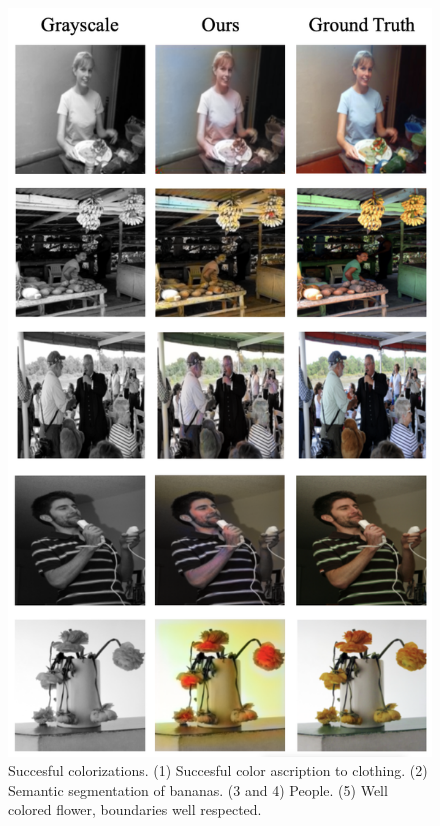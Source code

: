 \documentclass[10pt,twocolumn,letterpaper]{article}
\begin{document}
\begin{figure}
    \centering
    \includegraphics[width=1\linewidth]{latex/succesful colorizations.png}
    \caption{Succesful colorizations. (1) Succesful color ascription to clothing. (2) Semantic segmentation of bananas. (3 and 4) People. (5) Well colored flower, boundaries well respected. }
    \label{fig:enter-label}
\end{figure}
\end{document}
